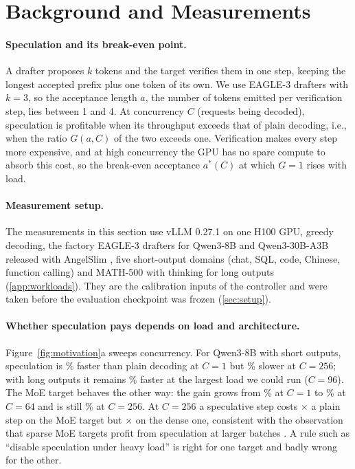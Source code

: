 \section{Background and Measurements}\label{sec:measure}

\paragraph{Speculation and its break-even point.} A drafter proposes $k$ tokens and the target verifies them in one step, keeping the longest accepted prefix plus one token of its own. We use EAGLE-3 drafters \citep{li2025eagle3} with $k{=}3$, so the acceptance length $a$, the number of tokens emitted per verification step, lies between 1 and 4. At concurrency $C$ (requests being decoded), speculation is profitable when its throughput exceeds that of plain decoding, i.e., when the ratio $G(a,C)$ of the two exceeds one. Verification makes every step more expensive, and at high concurrency the GPU has no spare compute to absorb this cost, so the break-even acceptance $a^{*}(C)$ at which $G=1$ rises with load.

\paragraph{Measurement setup.} The measurements in this section use vLLM 0.27.1 on one H100 GPU, greedy decoding, the factory EAGLE-3 drafters for Qwen3-8B and Qwen3-30B-A3B released with AngelSlim \citep{yang2025qwen3,angelslim}, five short-output domains (chat, SQL, code, Chinese, function calling) and MATH-500 with thinking for long outputs (\cref{app:workloads}). They are the calibration inputs of the controller and were taken before the evaluation checkpoint was frozen (\cref{sec:setup}).

\paragraph{Whether speculation pays depends on load and architecture.} Figure~\ref{fig:motivation}a sweeps concurrency. For Qwen3-8B with short outputs, speculation is \% faster than plain decoding at $C{=}1$ but \% slower at $C{=}256$; with long outputs it remains \% faster at the largest load we could run ($C{=}96$). The MoE target behaves the other way: the gain grows from \% at $C{=}1$ to \% at $C{=}64$ and is still \% at $C{=}256$. At $C{=}256$ a speculative step costs $\times$ a plain step on the MoE target but $\times$ on the dense one, consistent with the observation that sparse MoE targets profit from speculation at larger batches \citep{huang2025moesd}. A rule such as ``disable speculation under heavy load'' is right for one target and badly wrong for the other.

